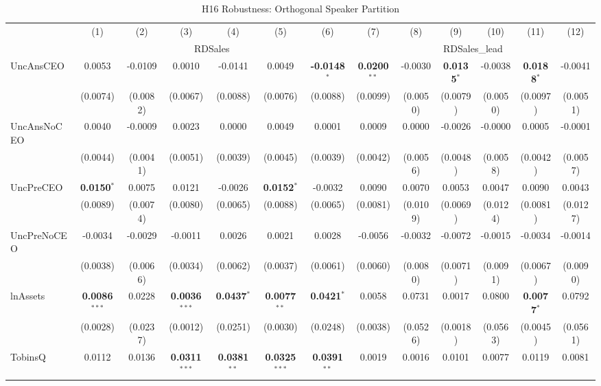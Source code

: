 \begin{landscape}
\begin{table}[H]
\setlength{\tabcolsep}{3pt}
\renewcommand{\arraystretch}{0.85}
\centering
\caption{H16 Robustness: Orthogonal Speaker Partition}
\label{tab:h16_robust}
\scriptsize
\begin{tabular}{lcccccccccccc}
\toprule
 & (1) & (2) & (3) & (4) & (5) & (6) & (7) & (8) & (9) & (10) & (11) & (12) \\
 & \multicolumn{6}{c}{RDSales} & \multicolumn{6}{c}{RDSales\_lead} \\
\cmidrule(lr){2-7} \cmidrule(lr){8-13}
\midrule
UncAnsCEO & 0.0053 & -0.0109 & 0.0010 & -0.0141 & 0.0049 & \textbf{-0.0148}$^{*}$ & \textbf{0.0200}$^{**}$ & -0.0030 & \textbf{0.0135}$^{*}$ & -0.0038 & \textbf{0.0188}$^{*}$ & -0.0041 \\
 & (0.0074) & (0.0082) & (0.0067) & (0.0088) & (0.0076) & (0.0088) & (0.0099) & (0.0050) & (0.0079) & (0.0050) & (0.0097) & (0.0051) \\
UncAnsNoCEO & 0.0040 & -0.0009 & 0.0023 & 0.0000 & 0.0049 & 0.0001 & 0.0009 & 0.0000 & -0.0026 & -0.0000 & 0.0005 & -0.0001 \\
 & (0.0044) & (0.0041) & (0.0051) & (0.0039) & (0.0045) & (0.0039) & (0.0042) & (0.0056) & (0.0048) & (0.0058) & (0.0042) & (0.0057) \\
UncPreCEO & \textbf{0.0150}$^{*}$ & 0.0075 & 0.0121 & -0.0026 & \textbf{0.0152}$^{*}$ & -0.0032 & 0.0090 & 0.0070 & 0.0053 & 0.0047 & 0.0090 & 0.0043 \\
 & (0.0089) & (0.0074) & (0.0080) & (0.0065) & (0.0088) & (0.0065) & (0.0081) & (0.0109) & (0.0069) & (0.0124) & (0.0081) & (0.0127) \\
UncPreNoCEO & -0.0034 & -0.0029 & -0.0011 & 0.0026 & 0.0021 & 0.0028 & -0.0056 & -0.0032 & -0.0072 & -0.0015 & -0.0034 & -0.0014 \\
 & (0.0038) & (0.0066) & (0.0034) & (0.0062) & (0.0037) & (0.0061) & (0.0060) & (0.0080) & (0.0071) & (0.0091) & (0.0067) & (0.0090) \\
\midrule
lnAssets & \textbf{0.0086}$^{***}$ & 0.0228 & \textbf{0.0036}$^{***}$ & \textbf{0.0437}$^{*}$ & \textbf{0.0077}$^{**}$ & \textbf{0.0421}$^{*}$ & 0.0058 & 0.0731 & 0.0017 & 0.0800 & \textbf{0.0077}$^{*}$ & 0.0792 \\
 & (0.0028) & (0.0237) & (0.0012) & (0.0251) & (0.0030) & (0.0248) & (0.0038) & (0.0526) & (0.0018) & (0.0563) & (0.0045) & (0.0561) \\
TobinsQ & 0.0112 & 0.0136 & \textbf{0.0311}$^{***}$ & \textbf{0.0381}$^{**}$ & \textbf{0.0325}$^{***}$ & \textbf{0.0391}$^{**}$ & 0.0019 & 0.0016 & 0.0101 & 0.0077 & 0.0119 & 0.0081 \\

\end{tabular}
\end{table}
\end{landscape}
